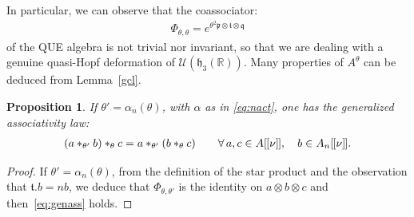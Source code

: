 \documentclass[pdftex]{sigma}
\numberwithin{equation}{section}
\newtheorem{prop}[thm]{Proposition}
\theoremstyle{definition}
\newcommand{\U}{\mathcal{U}}
\newcommand{\R}{\mathbb{R}}
\newcommand{\mf}{\mathfrak}
\newcommand{\lbrak}{[\hspace{-0.5pt}[}
\newcommand{\rbrak}{]\hspace{-0.5pt}]}
\newcommand{\ga}{\mf{p}}
\newcommand{\gb}{\mf{q}}
\newcommand{\gc}{\mf{t}}
\renewcommand{\hbar}{\nu}
\begin{document}
In particular, we can observe that the coassociator:
\begin{gather}\label{eq:coassociator}
\Phi_{\theta,\theta}=e^{\theta^2\ga \otimes \gc \otimes \gb}
\end{gather}
of the QUE algebra is not trivial nor invariant, so that we are dealing with a genuine quasi-Hopf deformation of $\U(\mf{h}_3(\R))$.
Many properties of $A^{\theta}$ can be deduced from Lemma~\ref{gcl}.

\begin{prop}\label{prop:gcl}
If $\theta'=\alpha_n(\theta)$, with $\alpha$ as in \eqref{eq:nact}, one has the generalized associativity law:
\begin{gather}\label{eq:genass}
(a\ast_{\theta'}b)\ast_\theta c=
a\ast_{\theta'}(b\ast_\theta c)
\qquad \forall\, a,c\in A\lbrak\hbar\rbrak,\quad b\in A_n\lbrak\hbar\rbrak.
\end{gather}
\end{prop}
\begin{proof}
If $\theta'=\alpha_n(\theta)$,
from the def\/inition of the star product and the observation that $\gc.b=nb$, we deduce that $\Phi_{\theta,\theta'}$ is the identity on $a\otimes b\otimes c$ and then~\eqref{eq:genass} holds.
\end{proof}
\end{document}
